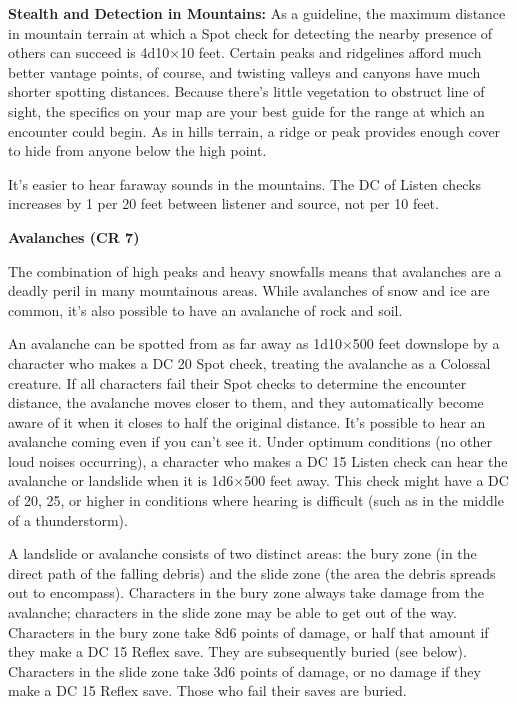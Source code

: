 \documentclass{article}
\begin{document}
\textbf{Stealth and Detection in Mountains:} As a guideline, the maximum distance 
in mountain terrain at which a Spot check for detecting the nearby presence of 
others can succeed is 4d10\ensuremath{\times}10 feet. Certain peaks and ridgelines 
afford much better vantage points, of course, and twisting valleys and canyons 
have much shorter spotting distances. Because there's little vegetation to obstruct 
line of sight, the specifics on your map are your best guide for the range at which 
an encounter could begin. As in hills terrain, a ridge or peak provides enough 
cover to hide from anyone below the high point.

It's easier to hear faraway sounds in the mountains. The DC of Listen checks increases 
by 1 per 20 feet between listener and source, not per 10 feet.

\textbf{Avalanches (CR 7)}

The combination of high peaks and heavy snowfalls means that avalanches are a deadly 
peril in many mountainous areas. While avalanches of snow and ice are common, it's 
also possible to have an avalanche of rock and soil.

An avalanche can be spotted from as far away as 1d10\ensuremath{\times}500 feet 
downslope by a character who makes a DC 20 Spot check, treating the avalanche as 
a Colossal creature. If all characters fail their Spot checks to determine the 
encounter distance, the avalanche moves closer to them, and they automatically 
become aware of it when it closes to half the original distance. It's possible 
to hear an avalanche coming even if you can't see it. Under optimum conditions 
(no other loud noises occurring), a character who makes a DC 15 Listen check can 
hear the avalanche or landslide when it is 1d6\ensuremath{\times}500 feet away. 
This check might have a DC of 20, 25, or higher in conditions where hearing is 
difficult (such as in the middle of a thunderstorm). 

A landslide or avalanche consists of two distinct areas: the bury zone (in the 
direct path of the falling debris) and the slide zone (the area the debris spreads 
out to encompass). Characters in the bury zone always take damage from the avalanche; 
characters in the slide zone may be able to get out of the way. Characters in the 
bury zone take 8d6 points of damage, or half that amount if they make a DC 15 Reflex 
save. They are subsequently buried (see below). Characters in the slide zone take 
3d6 points of damage, or no damage if they make a DC 15 Reflex save. Those who 
fail their saves are buried. 
\end{document}
